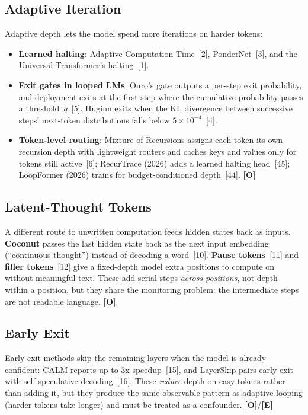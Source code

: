 \documentclass[11pt,letterpaper]{article}
\newcommand{\mO}{\textcolor{sensorteal}{\textbf{[O]}}}
\newcommand{\mE}{\textcolor{deepindigo}{\textbf{[E]}}}
\begin{document}
\subsection{Adaptive Iteration}

Adaptive depth lets the model spend more iterations on harder tokens:
\begin{itemize}
  \item \textbf{Learned halting}: Adaptive Computation Time~[2], PonderNet~[3], and the Universal Transformer's halting~[1].
  \item \textbf{Exit gates in looped LMs}: Ouro's gate outputs a per-step exit probability, and deployment exits at the first step where the cumulative probability passes a threshold~$q$~[5]. Huginn exits when the KL divergence between successive steps' next-token distributions falls below $5\times10^{-4}$~[4].
  \item \textbf{Token-level routing}: Mixture-of-Recursions assigns each token its own recursion depth with lightweight routers and caches keys and values only for tokens still active~[6]; RecurTrace (2026) adds a learned halting head~[45]; LoopFormer (2026) trains for budget-conditioned depth~[44]. \mO
\end{itemize}

\subsection{Latent-Thought Tokens}

A different route to unwritten computation feeds hidden states back as inputs. \textbf{Coconut} passes the last hidden state back as the next input embedding (``continuous thought'') instead of decoding a word~[10]. \textbf{Pause tokens}~[11] and \textbf{filler tokens}~[12] give a fixed-depth model extra positions to compute on without meaningful text. These add serial steps \emph{across positions}, not depth within a position, but they share the monitoring problem: the intermediate steps are not readable language. \mO

\subsection{Early Exit}

Early-exit methods skip the remaining layers when the model is already confident: CALM reports up to 3x speedup~[15], and LayerSkip pairs early exit with self-speculative decoding~[16]. These \emph{reduce} depth on easy tokens rather than adding it, but they produce the same observable pattern as adaptive looping (harder tokens take longer) and must be treated as a confounder. \mO/\mE
\end{document}
